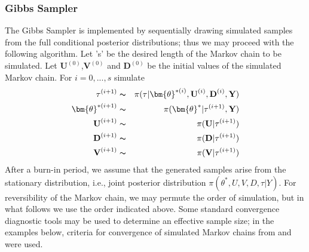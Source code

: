 \subsubsection{Gibbs Sampler}
The Gibbs Sampler is implemented by sequentially drawing simulated samples from the full conditional posterior distributions; thus we may proceed with the following algorithm.
Let 's' be the desired length of the Markov chain to be simulated.
 Let $\textbf{U}^{(0)}$,$\textbf{V}^{(0)}$ and $\textbf{D}^{(0)}$ be the initial values of the simulated Markov chain.
For $i=0,...,s$ simulate
\begin{eqnarray}
	\tau^{(i+1)} &\thicksim& \pi(\tau|\bm{\theta}^{*(i)},\textbf{U}^{(i)},\textbf{D}^{(i)},\textbf{Y}) \nonumber \\
	\bm{\theta}^{*(i+1)} &\thicksim& \pi (\bm{\theta}^*|\tau^{(i+1)},\textbf{Y}) \nonumber\\
	\textbf{U}^{(i+1)} & \thicksim & \pi(\textbf{U}|\tau^{(i+1)}) \nonumber \\
	\textbf{D}^{(i+1)} &\thicksim & \pi(\textbf{D}|\tau^{(i+1)}) \nonumber\\
	\textbf{V}^{(i+1)} &\thicksim& \pi(\textbf{V}|\tau^{(i+1)}) \nonumber
\end{eqnarray}
After a burn-in period, we assume that the generated samples arise from the stationary distribution, i.e., joint posterior distribution $\pi (\theta^*,U,V,D,\tau|Y)$. For reversibility of the Markov chain, we may permute the order of simulation, but in what follows we use the order indicated above. Some standard convergence diagnostic tools may be used to determine an effective sample size; in the examples below, criteria for convergence of simulated Markov chains from \citet{Raftery1995} and \citet{Gelman1992} were used.